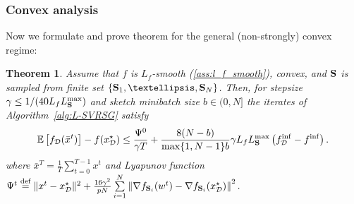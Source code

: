 \documentclass{article}
\newcommand{\bb}{\mathbb}
\newcommand{\cD}{\mathcal{D}}
\newcommand{\eqdef}{\stackrel{\text{def}}{=}}
\newcommand{\Exp}[1]{{\bb E}\left[#1\right]}
\newtheorem{theorem}{Theorem}
\theoremstyle{plain}
\newcommand{\tf}{f_{\mathcal{D}}}
\newcommand{\mS}{{\bf S}}
\theoremstyle{plain}
\theoremstyle{definition}
\theoremstyle{remark}
\begin{document}
\subsubsection{Convex analysis}

Now we formulate and prove theorem for the general (non-strongly) convex regime:
\begin{theorem}
Assume that $f$ is $L_f$-smooth (\ref{ass:l_f_smooth}), convex, and $\mS$ is sampled from finite set $\{\mS_1,\ldots, \mS_{N}\}$.
Then, for stepsize $\gamma \leq 1/(40 L_f L_{\mS}^{\max})$ and sketch minibatch size $b \in (0, N]$ the iterates of Algorithm~\ref{alg:L-SVRSG} satisfy
    $$  \Exp{\tf(\bar{x}^t)} - f(x_\cD^\star) \leq \frac{\Psi^0}{\gamma T} + \frac{8(N-b)}{\max\{1,N-1\}b} \gamma L_fL_{\mS}^{\max}\left(\tf^{\inf} - f^{\inf}\right).$$
    where $\bar{x}^T = \frac{1}{T}\sum^{T-1}_{t=0}x^t$  and Lyapunov function $\Psi^t \eqdef \|x^t - x_\cD^\star\|^2 + \frac{16 \gamma^2}{pN} \sum\limits^{N}_{i = 1}\left\|\nabla f_{\mS_i}(w^t) - \nabla f_{\mS_i}(x_\cD^\star)\right\|^2.$
\end{theorem}
\end{document}

